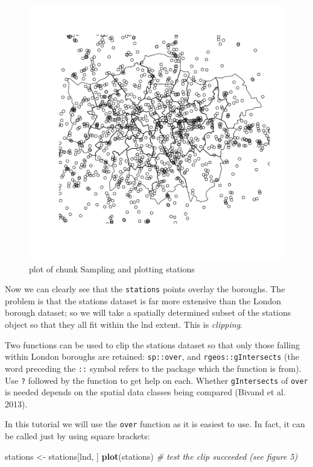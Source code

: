 \documentclass[]{article}
\newenvironment{Shaded}{}{}
\newcommand{\KeywordTok}[1]{\textcolor[rgb]{0.00,0.44,0.13}{\textbf{{#1}}}}
\newcommand{\StringTok}[1]{\textcolor[rgb]{0.25,0.44,0.63}{{#1}}}
\newcommand{\CommentTok}[1]{\textcolor[rgb]{0.38,0.63,0.69}{\textit{{#1}}}}
\newcommand{\NormalTok}[1]{{#1}}
\begin{document}
\begin{figure}[htbp]
\centering
\includegraphics{figure/Sampling_and_plotting_stations.png}
\caption{plot of chunk Sampling and plotting stations}
\end{figure}

Now we can clearly see that the \texttt{stations} points overlay the
boroughs. The problem is that the stations dataset is far more extensive
than the London borough dataset; so we will take a spatially determined
subset of the stations object so that they all fit within the lnd
extent. This is \emph{clipping}.

Two functions can be used to clip the stations dataset so that only
those falling within London boroughs are retained: \texttt{sp::over},
and \texttt{rgeos::gIntersects} (the word preceding the \texttt{::}
symbol refers to the package which the function is from). Use \texttt{?}
followed by the function to get help on each. Whether
\texttt{gIntersects} of \texttt{over} is needed depends on the spatial
data classes being compared (Bivand et al. 2013).

In this tutorial we will use the \texttt{over} function as it is easiest
to use. In fact, it can be called just by using square brackets:

\begin{Shaded}
\begin{Highlighting}[]
\NormalTok{stations <-}\StringTok{ }\NormalTok{stations[lnd, ]}
\KeywordTok{plot}\NormalTok{(stations)  }\CommentTok{# test the clip succeeded (see figure 5)}
\end{Highlighting}
\end{Shaded}
\end{document}
